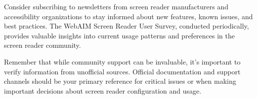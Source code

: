 Consider subscribing to newsletters from screen reader manufacturers and accessibility organizations to stay informed about new features, known issues, and best practices. The WebAIM Screen Reader User Survey, conducted periodically, provides valuable insights into current usage patterns and preferences in the screen reader community.

Remember that while community support can be invaluable, it's important to verify information from unofficial sources. Official documentation and support channels should be your primary reference for critical issues or when making important decisions about screen reader configuration and usage.
